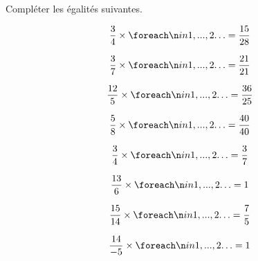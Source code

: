 \documentclass[a4paper]{book}
\begin{document}
    \begin{exercice}
        Compléter les égalités suivantes.
        
        \medskip
        
        \begin{minipage}{0.24\linewidth}
            \[\dfrac{3}{4}\times\points[2] = \dfrac{15}{28}\]

            \[\dfrac{3}{7}\times\points[2] = \dfrac{21}{21}\]
        \end{minipage}
        \hfill\vline\hfill
        \begin{minipage}{0.24\linewidth}
            \[\dfrac{12}{5}\times\points[2] = \dfrac{36}{25}\]

            \[\dfrac{5}{8}\times\points[2] = \dfrac{40}{40}\]
        \end{minipage}
        \hfill\vline\hfill
        \begin{minipage}{0.24\linewidth}
            \[\dfrac{3}{4}\times\points[2] = \dfrac{3}{7}\]

            \[\dfrac{13}{6}\times\points[2] = 1\]
        \end{minipage}
        \hfill\vline\hfill
        \begin{minipage}{0.24\linewidth}
              \[\dfrac{15}{14}\times\points[2] = \dfrac{7}{5}\]

            \[\dfrac{14}{-5}\times\points[2] = 1\]
        \end{minipage}
    \end{exercice}
\end{document}
